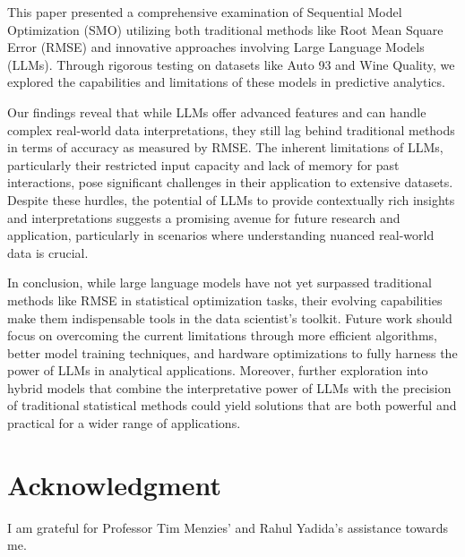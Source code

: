 \documentclass{ieeeaccess}
\begin{document}
This paper presented a comprehensive examination of Sequential Model Optimization (SMO) utilizing both traditional methods like Root Mean Square Error (RMSE) and innovative approaches involving Large Language Models (LLMs). Through rigorous testing on datasets like Auto 93 and Wine Quality, we explored the capabilities and limitations of these models in predictive analytics.

Our findings reveal that while LLMs offer advanced features and can handle complex real-world data interpretations, they still lag behind traditional methods in terms of accuracy as measured by RMSE. The inherent limitations of LLMs, particularly their restricted input capacity and lack of memory for past interactions, pose significant challenges in their application to extensive datasets. Despite these hurdles, the potential of LLMs to provide contextually rich insights and interpretations suggests a promising avenue for future research and application, particularly in scenarios where understanding nuanced real-world data is crucial.


In conclusion, while large language models have not yet surpassed traditional methods like RMSE in statistical optimization tasks, their evolving capabilities make them indispensable tools in the data scientist's toolkit. Future work should focus on overcoming the current limitations through more efficient algorithms, better model training techniques, and hardware optimizations to fully harness the power of LLMs in analytical applications. Moreover, further exploration into hybrid models that combine the interpretative power of LLMs with the precision of traditional statistical methods could yield solutions that are both powerful and practical for a wider range of applications.



\section*{Acknowledgment}
I am grateful for Professor Tim Menzies' and Rahul Yadida's assistance towards me.
\end{document}

